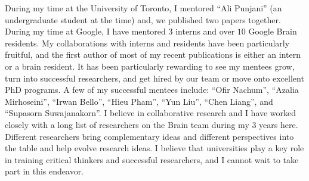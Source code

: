 \documentclass[a4paper, 10pt]{article}
\begin{document}
During my time at the University of Toronto, I mentored ``Ali
Punjani'' (an undergraduate student at the time) and, we published two
papers together. During my time at Google, I have mentored $3$ interns
and over $10$ Google Brain residents. My collaborations with interns
and residents have been particularly fruitful, and the first author of
most of my recent publications is either an intern or a brain
resident. It has been particularly rewarding to see my mentees grow,
turn into successful researchers, and get hired by our team or move
onto excellent PhD programs. A few of my successful mentees include:
``Ofir Nachum'', ``Azalia Mirhoseini'', ``Irwan Bello'', ``Hieu
Pham'', ``Yun Liu'', ``Chen Liang'', and ``Supasorn Suwajanakorn''. I
believe in collaborative research and I have worked closely with a
long list of researchers on the Brain team during my $3$ years here.
Different researchers bring complementary ideas and different
perspectives into the table and help evolve research ideas. I believe
that universities play a key role in training critical thinkers and
successful researchers, and I cannot wait to take part in this
endeavor.

\vspace{0.5cm}


\begin{small}




\end{small}
\end{document}

